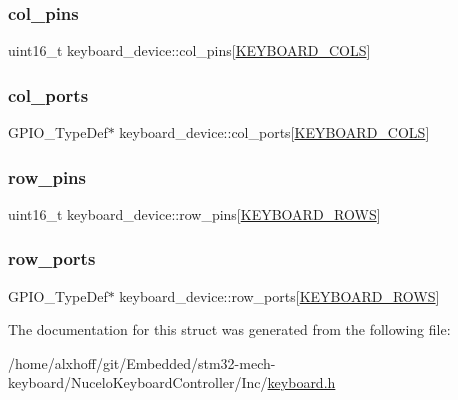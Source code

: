 \subsubsection{\texorpdfstring{col\+\_\+pins}{col\_pins}}
{\footnotesize\ttfamily uint16\+\_\+t keyboard\+\_\+device\+::col\+\_\+pins\mbox{[}\hyperlink{keymap_8h_ada65ea6a2010790e481acf033b2f8351}{K\+E\+Y\+B\+O\+A\+R\+D\+\_\+\+C\+O\+LS}\mbox{]}}

\mbox{\label{structkeyboard__device_ac896175bb4e598e4e62671f2525d93b5}} 
\subsubsection{\texorpdfstring{col\+\_\+ports}{col\_ports}}
{\footnotesize\ttfamily G\+P\+I\+O\+\_\+\+Type\+Def$\ast$ keyboard\+\_\+device\+::col\+\_\+ports\mbox{[}\hyperlink{keymap_8h_ada65ea6a2010790e481acf033b2f8351}{K\+E\+Y\+B\+O\+A\+R\+D\+\_\+\+C\+O\+LS}\mbox{]}}

\mbox{\label{structkeyboard__device_afb61cd72f0bdd515150a10e46e9ecfc3}} 
\subsubsection{\texorpdfstring{row\+\_\+pins}{row\_pins}}
{\footnotesize\ttfamily uint16\+\_\+t keyboard\+\_\+device\+::row\+\_\+pins\mbox{[}\hyperlink{keymap_8h_ab89c69b09d4ca01020b7c40d9ca2bab8}{K\+E\+Y\+B\+O\+A\+R\+D\+\_\+\+R\+O\+WS}\mbox{]}}

\mbox{\label{structkeyboard__device_a3538201c09ca68013a086626a63ca362}} 
\subsubsection{\texorpdfstring{row\+\_\+ports}{row\_ports}}
{\footnotesize\ttfamily G\+P\+I\+O\+\_\+\+Type\+Def$\ast$ keyboard\+\_\+device\+::row\+\_\+ports\mbox{[}\hyperlink{keymap_8h_ab89c69b09d4ca01020b7c40d9ca2bab8}{K\+E\+Y\+B\+O\+A\+R\+D\+\_\+\+R\+O\+WS}\mbox{]}}



The documentation for this struct was generated from the following file\+:\begin{DoxyCompactItemize}
\item 
/home/alxhoff/git/\+Embedded/stm32-\/mech-\/keyboard/\+Nucelo\+Keyboard\+Controller/\+Inc/\hyperlink{keyboard_8h}{keyboard.\+h}\end{DoxyCompactItemize}
